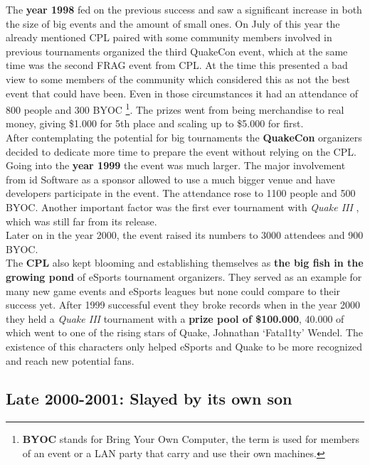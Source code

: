 The \textbf{year 1998} fed on the previous success and saw a significant increase in both the size of big events and the amount of small ones. On July of this year the already mentioned CPL paired with some community members involved in previous tournaments organized the third QuakeCon event, which at the same time was the second FRAG event from CPL. At the time this presented a bad view to some members of the community which considered this as not the best event that could have been. Even in those circumstances it had an attendance of 800 people and 300 BYOC \footnote{\textbf{BYOC} stands for Bring Your Own Computer, the term is used for members of an event or a LAN party that carry and use their own machines.}. The prizes went from being merchandise to real money, giving \$1.000 for 5th place and scaling up to \$5.000 for first.\\

After contemplating the potential for big tournaments the \textbf{QuakeCon} organizers decided to dedicate more time to prepare the event without relying on the CPL. Going into the \textbf{year 1999} the event was much larger. The major involvement from id Software as a sponsor allowed to use a much bigger venue and have developers participate in the event. The attendance rose to 1100 people and 500 BYOC. Another important factor was the first ever tournament with \textit{Quake III} \citep{game:quake3}, which was still far from its release.\\ Later on in the year 2000, the event raised its numbers to 3000 attendees and 900 BYOC.\\

The \textbf{CPL} also kept blooming and establishing themselves as \textbf{the big fish in the growing pond} of eSports tournament organizers. They served as an example for many new game events and eSports leagues but none could compare to their success yet. After 1999 successful event they broke records when in the year 2000 they held a \textit{Quake III} tournament with a \textbf{prize pool of \$100.000}, 40.000 of which went to one of the rising stars of Quake, Johnathan ‘Fatal1ty’ Wendel. The existence of this characters only helped eSports and Quake to be more recognized and reach new potential fans.


\subsection{Late 2000-2001: Slayed by its own son}






